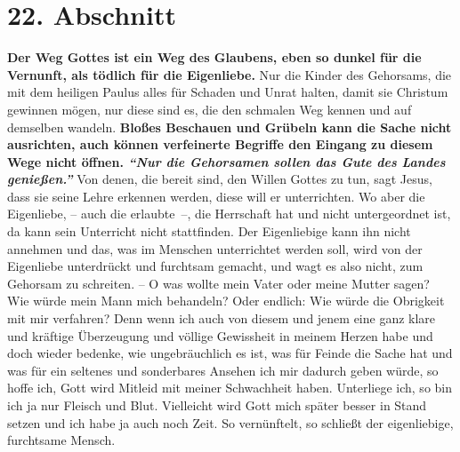 \section{22. Abschnitt} \label{kap4_ab22}

 \label{ref:04_22_vernunft}
\textbf{Der Weg Gottes ist ein Weg des Glaubens, eben so dunkel für die
Vernunft, als
tödlich für die Eigenliebe.} Nur die Kinder des Gehorsams,
 die mit dem heiligen
Paulus alles für Schaden und Unrat halten, damit sie Christum gewinnen mögen,
nur diese sind es, die den schmalen Weg kennen und auf demselben wandeln.
\textbf{Bloßes
Beschauen und Grübeln kann die Sache nicht ausrichten, auch können verfeinerte
Begriffe den Eingang zu diesem Wege nicht öffnen.
\textit{"`Nur die Gehorsamen sollen das Gute des Landes
genießen."'}}
Von denen, die bereit sind,
den Willen Gottes zu tun, sagt Jesus, dass sie seine Lehre erkennen
werden,
diese will er unterrichten. Wo aber die Eigenliebe,
-- auch die erlaubte~--, die Herrschaft hat und nicht untergeordnet ist, da kann
sein Unterricht nicht stattfinden. Der Eigenliebige kann ihn nicht annehmen und
das, was im Menschen unterrichtet werden soll, wird von der Eigenliebe
unterdrückt und furchtsam gemacht, und wagt es also nicht, zum Gehorsam zu
schreiten. -- O was wollte mein Vater oder meine Mutter sagen? Wie würde mein
Mann mich behandeln? Oder endlich: Wie würde die Obrigkeit mit mir verfahren?
Denn wenn ich auch von diesem und jenem eine ganz klare und kräftige
Überzeugung und völlige Gewissheit in meinem Herzen habe und doch wieder
bedenke, wie ungebräuchlich es ist, was für Feinde die Sache hat und was für
ein seltenes und sonderbares Ansehen ich mir dadurch geben würde, so hoffe ich,
Gott wird Mitleid mit meiner Schwachheit haben. Unterliege ich, so bin ich ja
nur Fleisch und Blut. Vielleicht wird Gott mich später besser in Stand
setzen und ich habe ja auch noch Zeit. So vernünftelt, so schließt der
eigenliebige, furchtsame Mensch.

\medskip

